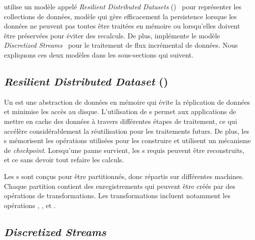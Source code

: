  utilise un mod\`ele appel\'e \emph{Resilient Distributed Datasets} ()~\citep{Salloum2016} pour repr\'esenter les collections de donn\'ees, mod\`ele qui g\`ere efficacement la persistence lorsque les donn\'ees ne peuvent pas toutes \^etre trait\'ees en m\'emoire ou lorsqu'elles doivent \^etre pr\'eserv\'ees pour \'eviter des recalculs. De plus,  impl\'emente le mod\`ele \emph{Discretized Streams}~\citep{zaharia2013discretized} pour le traitement de flux incr\'emental de donn\'ees.
%
Nous expliquons ces deux mod\`eles dans les sous-sections qui suivent.


\subsection{\emph{Resilient Distributed Dataset} ()}

Un  est une abstraction de donn\'ees en m\'emoire qui \'evite la r\'eplication de donn\'ees et minimise les acc\`es au disque. L'utilisation de s permet aux applications de mettre en cache des donn\'ees \`a travers diff\'erentes \'etapes de traitement, ce qui acc\'el\`ere consid\'erablement la r\'eutilisation pour les traitements futurs. De plus, les s m\'emorisent les op\'erations utilis\'ees pour les construire et utilisent un m\'ecanisme de \emph{checkpoint}. Lorsqu'une panne survient, les s requis peuvent \^etre reconstruits, et ce sans devoir tout refaire les calculs.

Les s sont conçus pour \^etre partitionn\'es, donc r\'epartis sur diff\'erentes machines. Chaque partition contient des enregistrements qui peuvent \^etre cr\'e\'es par des op\'erations de transformations. Les transformations incluent notamment les opérations , ,  et .





\subsection{\emph{Discretized Streams}}

